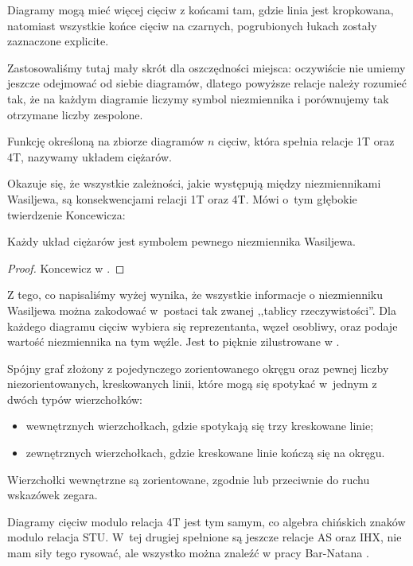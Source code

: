 Diagramy mogą mieć więcej cięciw z końcami tam, gdzie linia jest kropkowana, natomiast wszystkie końce cięciw na czarnych, pogrubionych łukach zostały zaznaczone explicite.

Zastosowaliśmy tutaj mały skrót dla oszczędności miejsca: oczywiście nie umiemy jeszcze odejmować od siebie diagramów, dlatego powyższe relacje należy rozumieć tak, że na każdym diagramie liczymy symbol niezmiennika i porównujemy tak otrzymane liczby zespolone.

\begin{definition}
%
    Funkcję określoną na zbiorze diagramów $n$ cięciw, która spełnia relacje 1T oraz 4T, nazywamy układem ciężarów.
\end{definition}

Okazuje się, że wszystkie zależności, jakie występują między niezmiennikami Wasiljewa, są konsekwencjami relacji 1T oraz 4T.
Mówi o~tym głębokie twierdzenie Koncewicza:

\begin{proposition}
    Każdy układ ciężarów jest symbolem pewnego niezmiennika Wasiljewa. %
\end{proposition}

\begin{proof}
    Koncewicz w \cite{kontsevich93}. %
\end{proof}

Z tego, co napisaliśmy wyżej wynika, że wszystkie informacje o niezmienniku Wasiljewa można zakodować w~postaci tak zwanej ,,tablicy rzeczywistości''.
Dla każdego diagramu cięciw wybiera się reprezentanta, węzeł osobliwy, oraz podaje wartość niezmiennika na tym węźle.
Jest to pięknie zilustrowane w \cite[sekcja 3.7]{duzhin12}.

\begin{definition}
    Spójny graf złożony z pojedynczego zorientowanego okręgu oraz pewnej liczby niezorientowanych, kreskowanych linii, które mogą się spotykać w~jednym z dwóch typów wierzchołków:
    \begin{itemize}
        \item wewnętrznych wierzchołkach, gdzie spotykają się trzy kreskowane linie;
        \item zewnętrznych wierzchołkach, gdzie kreskowane linie kończą się na okręgu.
    \end{itemize}
    Wierzchołki wewnętrzne są zorientowane, zgodnie lub przeciwnie do ruchu wskazówek zegara.
\end{definition}

Diagramy cięciw modulo relacja 4T jest tym samym, co algebra chińskich znaków modulo relacja STU.
%
W~tej drugiej spełnione są jeszcze relacje AS oraz IHX, nie mam siły tego rysować, ale wszystko można znaleźć w pracy Bar-Natana \cite{barnatan_95}.
%

